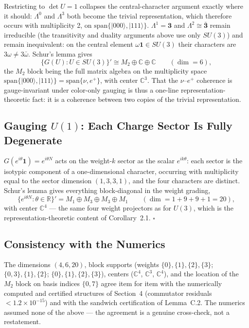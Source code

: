 \documentclass[11pt]{article}
\newcommand{\CC}{\mathbb{C}}
\newcommand{\RR}{\mathbb{R}}
\begin{document}
Restricting to $\det U = 1$ collapses the central-character argument exactly where it should: $\Lambda^0$ and $\Lambda^3$ both become the trivial representation, which therefore occurs with multiplicity 2, on $\mathrm{span}\{|000\rangle, |111\rangle\}$. $\Lambda^1 = \mathbf{3}$ and $\Lambda^2 \cong \bar{\mathbf{3}}$ remain irreducible (the transitivity and duality arguments above use only $SU(3)$) and remain inequivalent: on the central element $\omega\mathbf{1} \in SU(3)$ their characters are $3\omega \neq 3\bar\omega$. Schur's lemma gives
\begin{equation*}
\{G(U) : U \in SU(3)\}' \cong M_2 \oplus \CC \oplus \CC \qquad (\dim = 6),
\end{equation*}
the $M_2$ block being the full matrix algebra on the multiplicity space $\mathrm{span}\{|000\rangle, |111\rangle\} = \mathrm{span}\{\nu, e^+\}$, with center $\CC^3$. That the $\nu$--$e^+$ coherence is gauge-invariant under color-only gauging is thus a one-line representation-theoretic fact: it is a coherence between two copies of the trivial representation.

\subsection{Gauging \texorpdfstring{$U(1)$}{U(1)}: Each Charge Sector Is Fully Degenerate}

$G(e^{i\theta}\mathbf{1}) = e^{i\theta N}$ acts on the weight-$k$ sector as the scalar $e^{ik\theta}$: each sector is the isotypic component of a one-dimensional character, occurring with multiplicity equal to the sector dimension $(1, 3, 3, 1)$, and the four characters are distinct. Schur's lemma gives everything block-diagonal in the weight grading,
\begin{equation*}
\{e^{i\theta N} : \theta \in \RR\}' = M_1 \oplus M_3 \oplus M_3 \oplus M_1 \qquad (\dim = 1 + 9 + 9 + 1 = 20),
\end{equation*}
with center $\CC^4$ --- the same four weight projectors as for $U(3)$, which is the representation-theoretic content of Corollary~2.1. \hfill$\square$

\subsection{Consistency with the Numerics}

{\sloppy The dimensions $(4, 6, 20)$, block supports (weights $\{0\}, \{1\}, \{2\}, \{3\}$; $\{0,3\}, \{1\}, \{2\}$; $\{0\}, \{1\}, \{2\}, \{3\}$), centers ($\CC^4$, $\CC^3$, $\CC^4$), and the location of the $M_2$ block on basis indices $\{0, 7\}$ agree item for item with the numerically computed and certified structures of Section~4 (commutator residuals $< 1.2 \times 10^{-15}$) and with the sandwich certification of Lemma~C.2. The numerics assumed none of the above --- the agreement is a genuine cross-check, not a restatement.\par}
\end{document}
